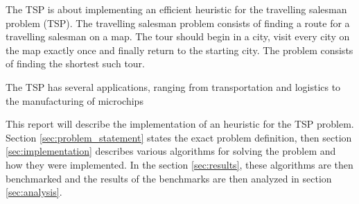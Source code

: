 The TSP is about implementing an efficient heuristic for the travelling 
salesman problem (TSP). The travelling salesman problem consists of finding a 
route for a travelling salesman on a map. The tour should begin in a city, 
visit every city on the map exactly once and finally return to the starting 
city. The problem consists of finding the shortest such tour.

The TSP has several applications, ranging from transportation and logistics to 
the manufacturing of microchips~\cite{wikipedia:tsp}

This report will describe the implementation of an heuristic for the TSP 
problem. Section \ref{sec:problem_statement} states the exact problem 
definition, then section \ref{sec:implementation} describes various algorithms 
for solving the problem and how they were implemented.
In the section \ref{sec:results}, these algorithms are then benchmarked and the 
results of the benchmarks are then analyzed in section \ref{sec:analysis}.
